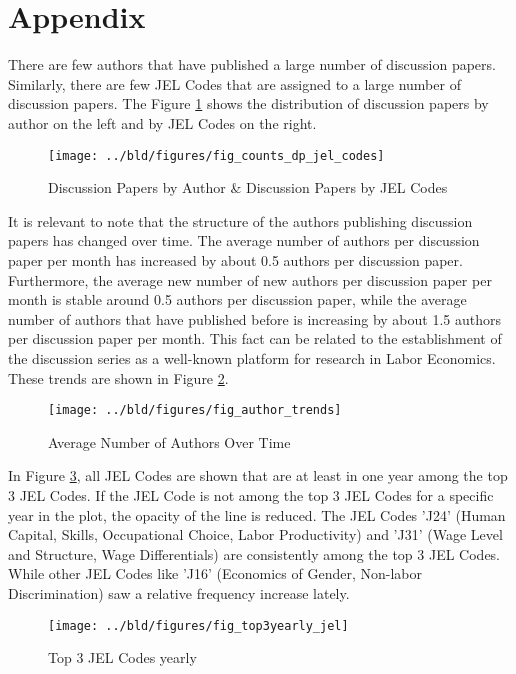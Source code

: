 \documentclass[11pt, a4paper, leqno]{article}
\begin{document}
\printbibliography

\clearpage

\section{Appendix}

There are few authors that have published a large number of discussion papers.
Similarly, there are few JEL Codes that are assigned to a large number of discussion papers.
The Figure \ref{fig:counts_dp_jel_codes} shows the distribution of discussion papers by author on the left and by JEL Codes on the right.

\begin{figure}[H]
    \centering
    \texttt{[image: ../bld/figures/fig\_counts\_dp\_jel\_codes]}
    \caption{Discussion Papers by Author \& Discussion Papers by JEL Codes}
    \label{fig:counts_dp_jel_codes}
\end{figure}

It is relevant to note that the structure of the authors publishing discussion papers has changed over time.
The average number of authors per discussion paper per month has increased by about 0.5 authors per discussion paper.
Furthermore, the average new number of new authors per discussion paper per month is stable around 0.5 authors per discussion paper, while the average number of authors that have published before is increasing by about 1.5 authors per discussion paper per month.
This fact can be related to the establishment of the discussion series as a well-known platform for research in Labor Economics.
These trends are shown in Figure \ref{fig:author_trends}.

\begin{figure}[H]
    \centering
    \texttt{[image: ../bld/figures/fig\_author\_trends]}
    \caption{Average Number of Authors Over Time}
    \label{fig:author_trends}
\end{figure}

In Figure \ref{fig:top3yearly_jel}, all JEL Codes are shown that are at least in one year among the top 3 JEL Codes.
If the JEL Code is not among the top 3 JEL Codes for a specific year in the plot, the opacity of the line is reduced.
The JEL Codes 'J24' (Human Capital, Skills, Occupational Choice, Labor Productivity) and 'J31' (Wage Level and Structure, Wage Differentials) are consistently among the top 3 JEL Codes.
While other JEL Codes like 'J16' (Economics of Gender, Non-labor Discrimination) saw a relative frequency increase lately.

\begin{figure}[H]
    \centering
    \texttt{[image: ../bld/figures/fig\_top3yearly\_jel]}
    \caption{Top 3 JEL Codes yearly}
    \label{fig:top3yearly_jel}
\end{figure}
\end{document}
